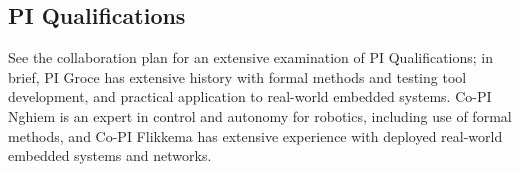 \subsection{PI Qualifications}

See the collaboration plan for an extensive examination of PI Qualifications; in brief, PI Groce has extensive history with formal methods and testing tool development, and practical application to real-world embedded systems.  Co-PI Nghiem is an expert in control and autonomy for robotics, including use of formal methods, and   Co-PI Flikkema has extensive experience with deployed real-world embedded systems and networks.


